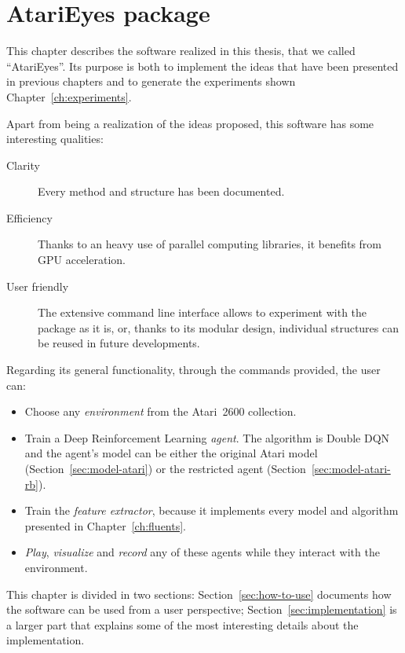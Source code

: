 \chapter{AtariEyes package}

\label{ch:atarieyes}

This chapter describes the software realized in this thesis, that we called
``AtariEyes''. Its purpose is both to implement the ideas that have been
presented in previous chapters and to generate the experiments shown
Chapter~\ref{ch:experiments}.

Apart from being a realization of the ideas proposed, this software has some
interesting qualities:
\begin{description}
	\item [Clarity] Every method and structure has been documented.
	\item [Efficiency] Thanks to an heavy use of parallel computing libraries,
		it benefits from GPU acceleration.
	\item [User friendly] The extensive command line interface allows to
		experiment with the package as it is, or, thanks to its modular design,
		individual structures can be reused in future developments.
\end{description}

Regarding its general functionality, through the commands provided, the user
can:
\begin{itemize}
	\item Choose any \emph{environment} from the Atari~2600 collection.
	\item Train a Deep Reinforcement Learning \emph{agent}. The algorithm is
		Double DQN and the agent's model can be either the original Atari model
		(Section~\ref{sec:model-atari}) or the restricted agent
		(Section~\ref{sec:model-atari-rb}).
	\item Train the \emph{feature extractor}, because it implements every model
		and algorithm presented in Chapter~\ref{ch:fluents}.
	\item \emph{Play}, \emph{visualize} and \emph{record} any of these
		agents while they interact with the environment.
\end{itemize}

This chapter is divided in two sections: Section~\ref{sec:how-to-use}
documents how the software can be used from a user perspective;
Section~\ref{sec:implementation} is a larger part that explains some of the
most interesting details about the implementation.


